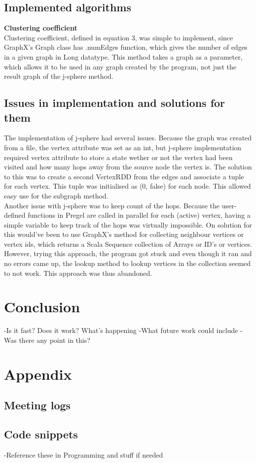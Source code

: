 \documentclass{article}
\theoremstyle{definition}
\begin{document}
\subsection{Implemented algorithms}

\textbf{Clustering coefficient} \\
Clustering coefficient, defined in equation 3, was simple to implement, since GraphX's Graph class has .numEdges function, which gives the number of edges in a given graph in Long datatype. This method takes a graph as a parameter, which allows it to be used in any graph created by the program, not just the result graph of the j-sphere method. \\

\textbf{}

\subsection{Issues in implementation and solutions for them}
The implementation of j-sphere had several issues. Because the graph was created from a file, the vertex attribute was set as an int, but j-sphere implementation required vertex attribute to store a state wether or not the vertex had been visited and how many hops away from the source node the vertex is. The solution to this was to create a second VertexRDD from the edges and associate a tuple for each vertex. This tuple was initialised as (0, false) for each node. This allowed easy use for the subgraph method. \\

Another issue with j-sphere was to keep count of the hops. Because the user-defined functions in Pregel are called in parallel for each (active) vertex, having a simple variable to keep track of the hops was virtually impossible. On solution for this would've been to use GraphX's method for collecting neighbour vertices or vertex ids, which returns a Scala Sequence collection of Arrays or ID's or vertices. However, trying this approach, the program got stuck and even though it ran and no errors came up, the lookup method to lookup vertices in the collection seemed to not work. This approach was thus abandoned. \\



\section{Conclusion}
-Is it fast? Does it work? What's happening
-What future work could include
-Was there any point in this? 



\section{Appendix}

\subsection{Meeting logs}

\subsection{Code snippets}
-Reference these in Programming and stuff if needed 
\end{document}
